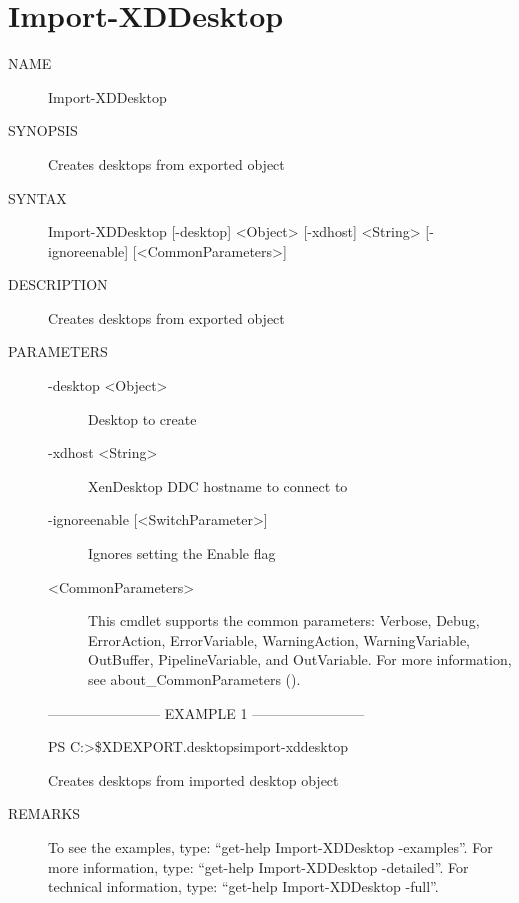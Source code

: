 \documentclass[letterpaper,10pt,english]{sphinxmanual}
\begin{document}
\section{Import-XDDesktop}
\label{\detokenize{cmd_import:import-xddesktop}}\begin{description}
\item[{NAME}] \leavevmode
Import-XDDesktop

\item[{SYNOPSIS}] \leavevmode
Creates desktops from exported object

\item[{SYNTAX}] \leavevmode
Import-XDDesktop {[}-desktop{]} \textless{}Object\textgreater{} {[}-xdhost{]} \textless{}String\textgreater{} {[}-ignoreenable{]} {[}\textless{}CommonParameters\textgreater{}{]}

\item[{DESCRIPTION}] \leavevmode
Creates desktops from exported object

\item[{PARAMETERS}] \leavevmode\begin{description}
\item[{-desktop \textless{}Object\textgreater{}}] \leavevmode
Desktop to create

\item[{-xdhost \textless{}String\textgreater{}}] \leavevmode
XenDesktop DDC hostname to connect to

\item[{-ignoreenable {[}\textless{}SwitchParameter\textgreater{}{]}}] \leavevmode
Ignores setting the Enable flag

\item[{\textless{}CommonParameters\textgreater{}}] \leavevmode
This cmdlet supports the common parameters: Verbose, Debug,
ErrorAction, ErrorVariable, WarningAction, WarningVariable,
OutBuffer, PipelineVariable, and OutVariable. For more information, see
about\_CommonParameters ().

\end{description}

————————\textendash{} EXAMPLE 1 ————————\textendash{}

PS C:\textgreater{}\$XDEXPORT.desktops\textbar{}import-xddesktop

Creates desktops from imported desktop object

\item[{REMARKS}] \leavevmode
To see the examples, type: “get-help Import-XDDesktop -examples”.
For more information, type: “get-help Import-XDDesktop -detailed”.
For technical information, type: “get-help Import-XDDesktop -full”.

\end{description}
\end{document}
